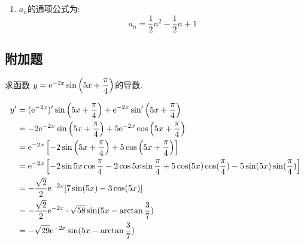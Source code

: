 \begin{questions}
\begin{solution}
\begin{enumerate}[label=\protect\circled{\arabic*}]
			\item $a_n$的通项公式为:
			      \begin{equation*}
				      a_n = \frac12n^2 - \frac12n + 1
			      \end{equation*}

		\end{enumerate}

	\end{solution}
	\begin{center}
		\section*{附加题}
	\end{center}
	\question 求函数 $y = \mathrm{e}^{-2x}\sin\left(5x+\dfrac{\pi}{4}\right)$的导数.
	\begin{solution}
		\begin{align*}
			y' & =  (\mathrm{e}^{-2x})'\sin\left(5x + \frac{\pi}{4}\right) + \mathrm{e}^{-2x}\sin'\left(5x +
			\frac{\pi}{4}\right)                                                               \\
			   & = -2\mathrm{e}^{-2x}\sin\left(5x+\frac{\pi}{4}\right) +
			5\mathrm{e}^{-2x}\cos\left(5x+\frac{\pi}{4}\right)                                        \\
			   & = \mathrm{e}^{-2x}\left[-2\sin\left(5x + \frac{\pi}{4}\right) + 5\cos\left(5x +
			\frac{\pi}{4}\right)\right]                                                        \\
			   & = \mathrm{e}^{-2x}\left[-2\sin5x\cos\frac{\pi}{4} - 2\cos5x\sin\frac{\pi}{4} +
			5\cos(5x)\cos(\frac{\pi}{4}) - 5\sin(5x)\sin(\frac{\pi}{4})\right]                 \\
			   & = -\frac{\sqrt{2}}{2}\mathrm{e}^{-2x}[7\sin(5x) - 3\cos(5x)]                         \\
			   & = -\frac{\sqrt{2}}{2}\mathrm{e}^{-2x}\cdot \sqrt{58}\sin({5x-\arctan{\frac37}})      \\
			   & = -\sqrt{29}\mathrm{e}^{-2x}\sin(5x-\arctan\frac37)
		\end{align*}
	\end{solution}


\end{questions}
